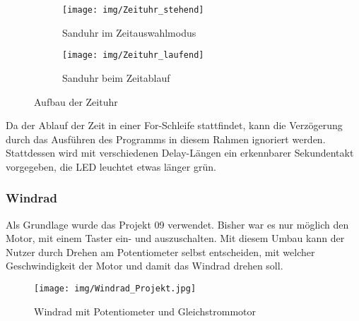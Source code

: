 \begin{figure}[h]
	\centering
	\begin{subfigure}[b]{0.48\linewidth}
		\centering
		\texttt{[image: img/Zeituhr\_stehend]}
		\caption{Sanduhr im Zeitauswahlmodus}\label{stehend}
	\end{subfigure}\enspace%
	\begin{subfigure}[b]{0.48\linewidth}
		\centering
		\texttt{[image: img/Zeituhr\_laufend]}
		\caption{Sanduhr beim Zeitablauf}\label{laufend}
	\end{subfigure}
	\caption{Aufbau der Zeituhr}\label{Zeituhr}
\end{figure}

Da der Ablauf der Zeit in einer For-Schleife stattfindet, kann die Verzögerung durch das Ausführen des Programms in diesem Rahmen ignoriert werden. Stattdessen wird mit verschiedenen Delay-Längen ein erkennbarer Sekundentakt vorgegeben, die LED leuchtet etwas länger grün. 

\subsubsection{Windrad}

 Als Grundlage wurde das Projekt 09 \autocite{arduino} verwendet. Bisher war es nur möglich den Motor, mit einem Taster ein- und auszuschalten. Mit diesem Umbau kann der Nutzer durch Drehen am Potentiometer selbst entscheiden, mit welcher Geschwindigkeit der Motor und damit das Windrad drehen soll.
\\

\begin{figure}[h]
\begin{center}
\texttt{[image: img/Windrad\_Projekt.jpg]}
\caption{Windrad mit Potentiometer und Gleichstrommotor}
\label{Windrad_project}
\end{center}
\end{figure}
